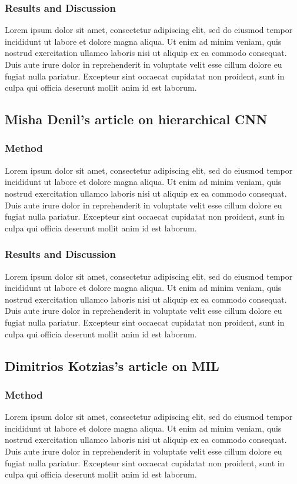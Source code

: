 \subsubsection{Results and Discussion}
Lorem ipsum dolor sit amet, consectetur adipiscing elit, sed do eiusmod tempor incididunt ut labore et dolore magna aliqua. Ut enim ad minim veniam, quis nostrud exercitation ullamco laboris nisi ut aliquip ex ea commodo consequat. Duis aute irure dolor in reprehenderit in voluptate velit esse cillum dolore eu fugiat nulla pariatur. Excepteur sint occaecat cupidatat non proident, sunt in culpa qui officia deserunt mollit anim id est laborum.

\subsection{Misha Denil's article on hierarchical CNN}
\subsubsection{Method}
Lorem ipsum dolor sit amet, consectetur adipiscing elit, sed do eiusmod tempor incididunt ut labore et dolore magna aliqua. Ut enim ad minim veniam, quis nostrud exercitation ullamco laboris nisi ut aliquip ex ea commodo consequat. Duis aute irure dolor in reprehenderit in voluptate velit esse cillum dolore eu fugiat nulla pariatur. Excepteur sint occaecat cupidatat non proident, sunt in culpa qui officia deserunt mollit anim id est laborum.
\subsubsection{Results and Discussion}
Lorem ipsum dolor sit amet, consectetur adipiscing elit, sed do eiusmod tempor incididunt ut labore et dolore magna aliqua. Ut enim ad minim veniam, quis nostrud exercitation ullamco laboris nisi ut aliquip ex ea commodo consequat. Duis aute irure dolor in reprehenderit in voluptate velit esse cillum dolore eu fugiat nulla pariatur. Excepteur sint occaecat cupidatat non proident, sunt in culpa qui officia deserunt mollit anim id est laborum.

\subsection{Dimitrios Kotzias's article on MIL}
\subsubsection{Method}
Lorem ipsum dolor sit amet, consectetur adipiscing elit, sed do eiusmod tempor incididunt ut labore et dolore magna aliqua. Ut enim ad minim veniam, quis nostrud exercitation ullamco laboris nisi ut aliquip ex ea commodo consequat. Duis aute irure dolor in reprehenderit in voluptate velit esse cillum dolore eu fugiat nulla pariatur. Excepteur sint occaecat cupidatat non proident, sunt in culpa qui officia deserunt mollit anim id est laborum.
